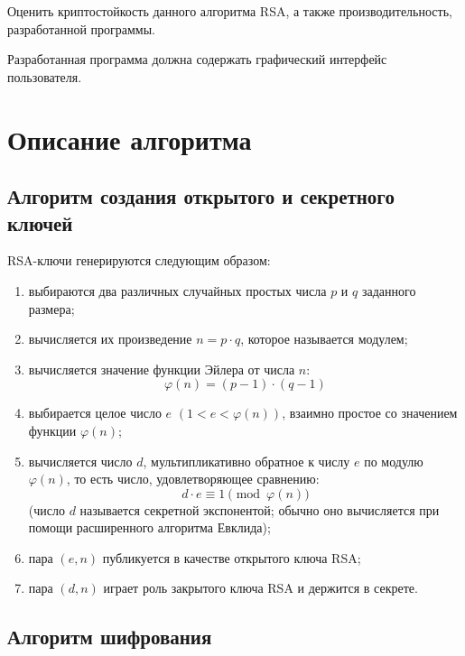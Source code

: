 \documentclass[utf8x, 14pt, bold, times]{G7-32} %
\begin{document}
Оценить криптостойкость данного алгоритма RSA, а также производительность,
разработанной программы.

Разработанная программа должна содержать графический интерфейс пользователя.

\mainmatter %
\newpage

\chapter{Описание алгоритма}

\section{Алгоритм создания открытого и секретного ключей}

RSA-ключи генерируются следующим образом:

\begin{enumerate}
\item выбираются два различных случайных простых числа $p$ и $q$ заданного размера;
\item вычисляется их произведение $n = p \cdot q$, которое называется модулем;
\item вычисляется значение функции Эйлера от числа $n$:
      \begin{equation}
        \varphi(n) = (p − 1) \cdot (q − 1)
      \end{equation}
\item выбирается целое число $e$ $(1 < e < \varphi(n))$, взаимно простое со значением
      функции $\varphi(n)$;
\item вычисляется число $d$, мультипликативно обратное к числу $e$ по модулю $\varphi(n)$,
      то есть число, удовлетворяющее сравнению:
      \begin{equation}
        d \cdot e \equiv 1 \pmod{\varphi(n)} 
      \end{equation}
      (число $d$ называется секретной экспонентой; обычно оно вычисляется при помощи расширенного алгоритма Евклида);
\item пара $(e, n)$ публикуется в качестве открытого ключа RSA;
\item пара $(d, n)$ играет роль закрытого ключа RSA и держится в секрете.
\end{enumerate}

\section{Алгоритм шифрования}
\end{document}
